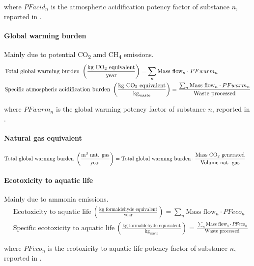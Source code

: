 \documentclass[10pt,a4paper]{article}
\begin{document}
where $PFacid_{n}$ is the atmospheric acidification potency factor of substance $n$, reported in \cite{IChemE_sust_metrics}.

\paragraph{Global warming burden}
Mainly due to potential CO\textsubscript{2} amd CH\textsubscript{4} emissions.
\begin{align} 
& \text{Total global warming burden} \ \left(\frac{\text{kg CO\textsubscript{2} equivalent}}{\text{year}}\right) = \sum_{n} \text{Mass flow}_{n} \cdot PFwarm_{n} \\
& \text{Specific atmospheric acidification burden} \ \left(\frac{\text{kg CO\textsubscript{2} equivalent}}{\text{kg}_{\text{waste}}}\right) = \frac{\sum_{n} \text{Mass flow}_{n} \cdot PFwarm_{n}}{\text{Waste processed}}
\end{align}

where $PFwarm_{n}$ is the global warming potency factor of substance $n$, reported in \cite{IChemE_sust_metrics}.

\paragraph{Natural gas equivalent}
\begin{align} 
& \text{Total global warming burden} \ \left(\frac{\text{m\textsuperscript{3} nat. gas}}{\text{year}}\right) = \text{Total global warming burden} \cdot \frac{\text {Mass CO\textsubscript{2} generated}}{\text{Volume nat. gas}}
\end{align}

\paragraph{Ecotoxicity to aquatic life}
Mainly due to ammonia emissions.
\begin{align} 
& \text{Ecotoxicity to aquatic life} \ \left(\frac{\text{kg formaldehyde equivalent}}{\text{year}}\right) = \sum_{n} \text{Mass flow}_{n} \cdot PFeco_{n} \\
& \text{Specific ecotoxicity to aquatic life} \ \left(\frac{\text{kg formaldehyde equivalent}}{\text{kg}_{\text{waste}}}\right) = \frac{\sum_{n} \text{Mass flow}_{n} \cdot PFeco_{n}}{\text{Waste processed}}
\end{align}

where $PFeco_{n}$ is the ecotoxicity to aquatic life potency factor of substance $n$, reported in \cite{IChemE_sust_metrics}.
\end{document}
